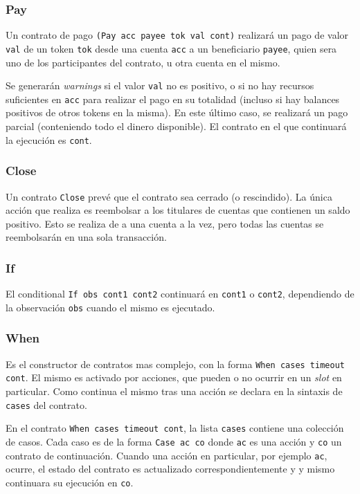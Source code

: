 \documentclass[12pt]{book}
\begin{document}
\subsubsection{Pay}
Un contrato de pago \texttt{(Pay acc payee tok val cont)} realizará un pago de valor \texttt{val} de un token \texttt{tok} desde una cuenta \texttt{acc} a un beneficiario \texttt{payee}, quien sera uno de los participantes del contrato, u otra cuenta en el mismo.

Se generarán \textit{warnings} si el valor \texttt{val} no es positivo, o si no hay recursos suficientes en \texttt{acc} para realizar el pago en su totalidad (incluso si hay balances positivos de otros tokens en la misma). En este último caso, se realizará un pago parcial (conteniendo todo el dinero disponible). El contrato en el que continuará la ejecución es \texttt{cont}.

\subsubsection{Close}\label{sssec:Close}

Un contrato \texttt{Close} prevé que el contrato sea cerrado (o rescindido). La única acción que realiza es reembolsar a los titulares de cuentas que contienen un saldo positivo. Esto se realiza de a una cuenta a la vez, pero todas las cuentas se reembolsarán en una sola transacción.

\subsubsection{If}
El conditional \texttt{If obs cont1 cont2} continuará en \texttt{cont1} o \texttt{cont2}, dependiendo de la observación \texttt{obs} cuando el mismo es ejecutado.

\subsubsection{When}
Es el constructor de contratos mas complejo, con la forma \texttt{When cases timeout cont}. El mismo es activado por acciones, que pueden o no ocurrir en un \textit{slot} en particular. Como continua el mismo tras una acción se declara en la sintaxis de \texttt{cases} del contrato.

En el contrato \texttt{When cases timeout cont}, la lista \texttt{cases} contiene una colección de casos. Cada caso es de la forma \texttt{Case ac co} donde \texttt{ac} es una acción y \texttt{co} un contrato de continuación. Cuando una acción en particular, por ejemplo \texttt{ac}, ocurre, el estado del contrato es actualizado correspondientemente y y mismo continuara su ejecución en \texttt{co}.
\end{document}
